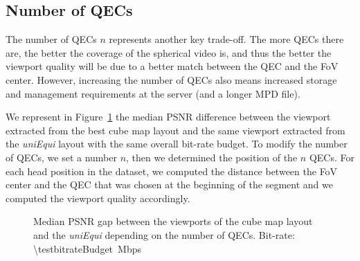 \subsection{Number of \acp{QEC}}

The number of \acp{QEC} $n$ represents another key trade-off. The more
\acp{QEC} there are, the better the coverage of the spherical video
is, and thus the better the viewport quality will be due to a better
match between the \ac{QEC} and the \ac{FoV} center. However,
increasing the number of \acp{QEC} also means increased storage and
management requirements at the server (and a longer \ac{MPD} file).


We represent in Figure~\ref{fig:QEC} the median \ac{PSNR} difference
between the viewport extracted from the best cube map layout and the
same viewport extracted from the \emph{uniEqui} layout with the same
overall bit-rate budget. To modify the number of \acp{QEC}, we set a
number $n$, then we determined the position of the $n$ \acp{QEC}.
For each head position in the dataset, we computed the distance
between the \ac{FoV} center and the \ac{QEC} that was chosen at the
beginning of the segment and we computed the viewport quality
accordingly.
%
%


\begin{figure}[htbp]
\centering

\caption{Median \acs{PSNR} gap between the viewports of the cube map layout and the \textit{uniEqui} depending
on the number of QECs.
Bit-rate: \SI{\testbitrateBudget}{\mega bps}}
\label{fig:QEC}
\end{figure}

